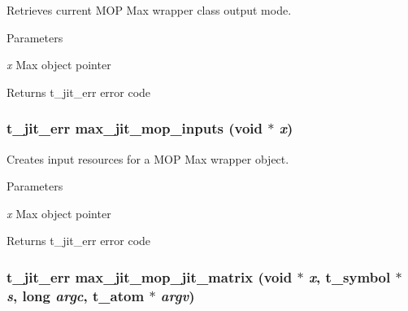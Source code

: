Retrieves current MOP Max wrapper class output mode. 
\begin{DoxyParams}{Parameters}
\item[{\em x}]Max object pointer\end{DoxyParams}
\begin{DoxyReturn}{Returns}
t\_\-jit\_\-err error code 
\end{DoxyReturn}
\hypertarget{group__maxmopmod_gaec99be7b60c1cec6a8391097d5008bc6}{
\subsubsection[{max\_\-jit\_\-mop\_\-inputs}]{\setlength{\rightskip}{0pt plus 5cm}t\_\-jit\_\-err max\_\-jit\_\-mop\_\-inputs (void $\ast$ {\em x})}}
\label{group__maxmopmod_gaec99be7b60c1cec6a8391097d5008bc6}


Creates input resources for a MOP Max wrapper object. 
\begin{DoxyParams}{Parameters}
\item[{\em x}]Max object pointer\end{DoxyParams}
\begin{DoxyReturn}{Returns}
t\_\-jit\_\-err error code 
\end{DoxyReturn}
\hypertarget{group__maxmopmod_gaf2aa6f991436199827afe1f934ec9150}{
\subsubsection[{max\_\-jit\_\-mop\_\-jit\_\-matrix}]{\setlength{\rightskip}{0pt plus 5cm}t\_\-jit\_\-err max\_\-jit\_\-mop\_\-jit\_\-matrix (void $\ast$ {\em x}, \/  {\bf t\_\-symbol} $\ast$ {\em s}, \/  long {\em argc}, \/  {\bf t\_\-atom} $\ast$ {\em argv})}}
\label{group__maxmopmod_gaf2aa6f991436199827afe1f934ec9150}


